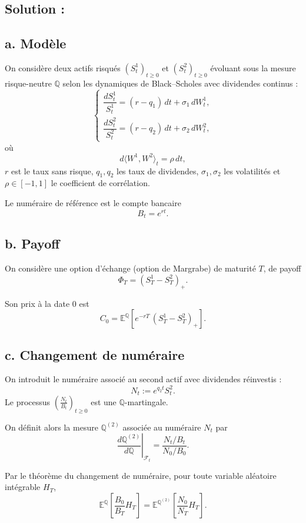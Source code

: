\subsection*{Solution :}



\subsection*{a. Modèle}

On considère deux actifs risqués $(S_t^1)_{t \ge 0}$ et $(S_t^2)_{t \ge 0}$ évoluant sous la mesure risque-neutre $\mathbb Q$ selon les dynamiques de Black--Scholes avec dividendes continus :
\[
\begin{cases}
\dfrac{dS_t^1}{S_t^1} = (r - q_1)\,dt + \sigma_1\, dW_t^1, \\
\dfrac{dS_t^2}{S_t^2} = (r - q_2)\,dt + \sigma_2\, dW_t^2,
\end{cases}
\]
où
\[
d\langle W^1, W^2 \rangle_t = \rho\,dt,
\]
$r$ est le taux sans risque, $q_1, q_2$ les taux de dividendes, $\sigma_1, \sigma_2$ les volatilités et $\rho \in [-1,1]$ le coefficient de corrélation.

Le numéraire de référence est le compte bancaire
\[
B_t = e^{rt}.
\]

\subsection*{b. Payoff}

On considère une option d’échange (option de Margrabe) de maturité $T$, de payoff
\[
\Phi_T = (S_T^1 - S_T^2)_+.
\]

Son prix à la date $0$ est
\[
C_0 = \mathbb E^{\mathbb Q}\left[ e^{-rT}\,(S_T^1 - S_T^2)_+ \right].
\]

\subsection*{c. Changement de numéraire}

On introduit le numéraire associé au second actif avec dividendes réinvestis :
\[
N_t := e^{q_2 t} S_t^2.
\]
Le processus $\left( \frac{N_t}{B_t} \right)_{t \ge 0}$ est une $\mathbb Q$-martingale.

On définit alors la mesure $\mathbb Q^{(2)}$ associée au numéraire $N_t$ par
\[
\left.\frac{d\mathbb Q^{(2)}}{d\mathbb Q}\right|_{\mathcal F_t}
= \frac{N_t / B_t}{N_0 / B_0}.
\]

Par le théorème du changement de numéraire, pour toute variable aléatoire intégrable $H_T$,
\[
\mathbb E^{\mathbb Q}\left[ \frac{B_0}{B_T} H_T \right]
= \mathbb E^{\mathbb Q^{(2)}}\left[ \frac{N_0}{N_T} H_T \right].
\]

